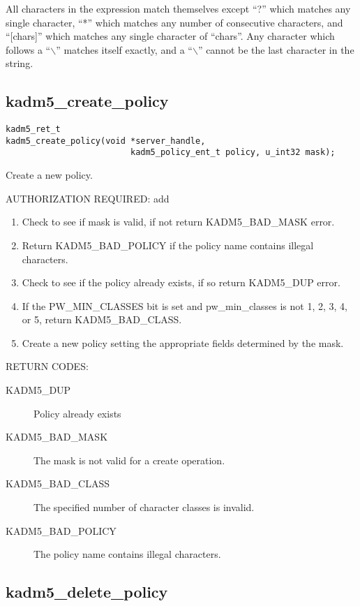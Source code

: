 All characters in the expression match themselves except ``?'' which
matches any single character, ``*'' which matches any number of
consecutive characters, and ``[chars]'' which matches any single
character of ``chars''. Any character which follows a ``$\backslash$''
matches itself exactly, and a ``$\backslash$'' cannot be the last
character in the string.

\subsection{kadm5_create_policy}

\begin{verbatim}
kadm5_ret_t
kadm5_create_policy(void *server_handle,
                         kadm5_policy_ent_t policy, u_int32 mask); 
\end{verbatim}

Create a new policy.

AUTHORIZATION REQUIRED: add

\begin{enumerate}
\item Check to see if mask is valid, if not return KADM5_BAD_MASK error.
\item Return KADM5_BAD_POLICY if the policy name contains illegal
characters.

\item Check to see if the policy already exists, if so return
KADM5_DUP error. 
\item If the PW_MIN_CLASSES bit is set and pw_min_classes is not 1, 2,
3, 4, or 5, return KADM5_BAD_CLASS.
\item Create a new policy setting the appropriate fields determined
by the mask.
\end{enumerate}

RETURN CODES:

\begin{description}
\item[KADM5_DUP] Policy already exists
\item[KADM5_BAD_MASK] The mask is not valid for a create
operation.
\item[KADM5_BAD_CLASS] The specified number of character classes
is invalid.
\item[KADM5_BAD_POLICY] The policy name contains illegal characters.
\end{description}

\subsection{kadm5_delete_policy}

